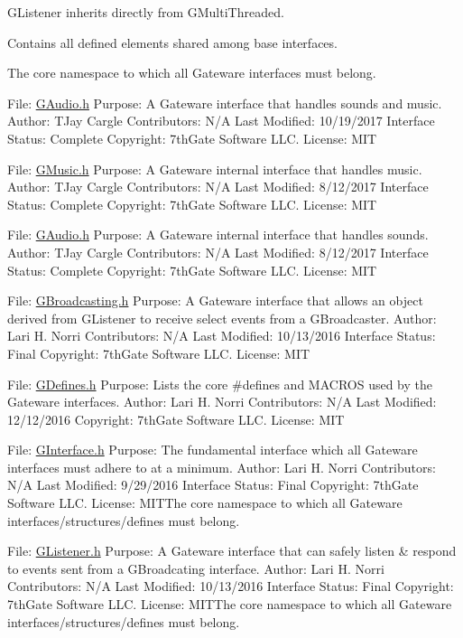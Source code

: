 G\+Listener inherits directly from G\+Multi\+Threaded.

Contains all defined elements shared among base interfaces.

The core namespace to which all Gateware interfaces must belong.

File\+: \mbox{\hyperlink{GAudio_8h_source}{G\+Audio.\+h}} Purpose\+: A Gateware interface that handles sounds and music. Author\+: T\+Jay Cargle Contributors\+: N/A Last Modified\+: 10/19/2017 Interface Status\+: Complete Copyright\+: 7th\+Gate Software L\+LC. License\+: M\+IT

File\+: \mbox{\hyperlink{GMusic_8h_source}{G\+Music.\+h}} Purpose\+: A Gateware internal interface that handles music. Author\+: T\+Jay Cargle Contributors\+: N/A Last Modified\+: 8/12/2017 Interface Status\+: Complete Copyright\+: 7th\+Gate Software L\+LC. License\+: M\+IT

File\+: \mbox{\hyperlink{GAudio_8h_source}{G\+Audio.\+h}} Purpose\+: A Gateware internal interface that handles sounds. Author\+: T\+Jay Cargle Contributors\+: N/A Last Modified\+: 8/12/2017 Interface Status\+: Complete Copyright\+: 7th\+Gate Software L\+LC. License\+: M\+IT

File\+: \mbox{\hyperlink{GBroadcasting_8h_source}{G\+Broadcasting.\+h}} Purpose\+: A Gateware interface that allows an object derived from G\+Listener to receive select events from a G\+Broadcaster. Author\+: Lari H. Norri Contributors\+: N/A Last Modified\+: 10/13/2016 Interface Status\+: Final Copyright\+: 7th\+Gate Software L\+LC. License\+: M\+IT

File\+: \mbox{\hyperlink{GDefines_8h_source}{G\+Defines.\+h}} Purpose\+: Lists the core \#defines and M\+A\+C\+R\+OS used by the Gateware interfaces. Author\+: Lari H. Norri Contributors\+: N/A Last Modified\+: 12/12/2016 Copyright\+: 7th\+Gate Software L\+LC. License\+: M\+IT

File\+: \mbox{\hyperlink{GInterface_8h_source}{G\+Interface.\+h}} Purpose\+: The fundamental interface which all Gateware interfaces must adhere to at a minimum. Author\+: Lari H. Norri Contributors\+: N/A Last Modified\+: 9/29/2016 Interface Status\+: Final Copyright\+: 7th\+Gate Software L\+LC. License\+: M\+I\+T\+The core namespace to which all Gateware interfaces/structures/defines must belong.

File\+: \mbox{\hyperlink{GListener_8h_source}{G\+Listener.\+h}} Purpose\+: A Gateware interface that can safely listen \& respond to events sent from a G\+Broadcating interface. Author\+: Lari H. Norri Contributors\+: N/A Last Modified\+: 10/13/2016 Interface Status\+: Final Copyright\+: 7th\+Gate Software L\+LC. License\+: M\+I\+T\+The core namespace to which all Gateware interfaces/structures/defines must belong.

